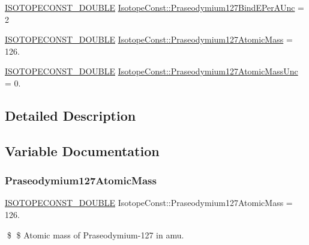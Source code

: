 \begin{DoxyCompactItemize}
\item 
\mbox{\hyperlink{group___isotope_const-_macros_ga8f45a7272ce02c0b4c65c44636ed719a}{I\+S\+O\+T\+O\+P\+E\+C\+O\+N\+S\+T\+\_\+\+D\+O\+U\+B\+LE}} \mbox{\hyperlink{group___isotope_const-_praseodymium-_pr127_ga9bff6cbac5c9b9be01c7cbb29d3e630c}{Isotope\+Const\+::\+Praseodymium127\+Bind\+E\+Per\+A\+Unc}} = 2
\item 
\mbox{\hyperlink{group___isotope_const-_macros_ga8f45a7272ce02c0b4c65c44636ed719a}{I\+S\+O\+T\+O\+P\+E\+C\+O\+N\+S\+T\+\_\+\+D\+O\+U\+B\+LE}} \mbox{\hyperlink{group___isotope_const-_praseodymium-_pr127_ga0c26969d75cf92d8f33d0a6c0c5c87e5}{Isotope\+Const\+::\+Praseodymium127\+Atomic\+Mass}} = 126.
\item 
\mbox{\hyperlink{group___isotope_const-_macros_ga8f45a7272ce02c0b4c65c44636ed719a}{I\+S\+O\+T\+O\+P\+E\+C\+O\+N\+S\+T\+\_\+\+D\+O\+U\+B\+LE}} \mbox{\hyperlink{group___isotope_const-_praseodymium-_pr127_gac7e64e20d1c79f04136c0f90f100edef}{Isotope\+Const\+::\+Praseodymium127\+Atomic\+Mass\+Unc}} = 0.
\end{DoxyCompactItemize}


\subsection{Detailed Description}


\subsection{Variable Documentation}
\mbox{\label{group___isotope_const-_praseodymium-_pr127_ga0c26969d75cf92d8f33d0a6c0c5c87e5}} 
\subsubsection{\texorpdfstring{Praseodymium127\+Atomic\+Mass}{Praseodymium127AtomicMass}}
{\footnotesize\ttfamily \mbox{\hyperlink{group___isotope_const-_macros_ga8f45a7272ce02c0b4c65c44636ed719a}{I\+S\+O\+T\+O\+P\+E\+C\+O\+N\+S\+T\+\_\+\+D\+O\+U\+B\+LE}} Isotope\+Const\+::\+Praseodymium127\+Atomic\+Mass = 126.}

\$ \$ Atomic mass of Praseodymium-\/127 in amu. \mbox{\label{group___isotope_const-_praseodymium-_pr127_gac7e64e20d1c79f04136c0f90f100edef}} 
